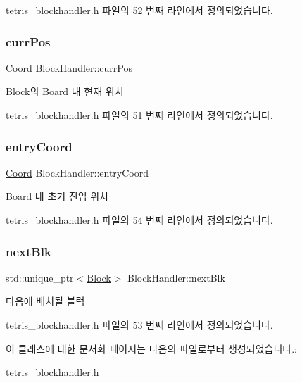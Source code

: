 tetris\+\_\+blockhandler.\+h 파일의 52 번째 라인에서 정의되었습니다.

\mbox{\label{class_block_handler_a11bd634fdc179446f9c6751e2394999e}} 
\subsubsection{\texorpdfstring{curr\+Pos}{currPos}}
{\footnotesize\ttfamily \mbox{\hyperlink{struct_coord}{Coord}} Block\+Handler\+::curr\+Pos}



Block의 \mbox{\hyperlink{class_board}{Board}} 내 현재 위치 



tetris\+\_\+blockhandler.\+h 파일의 51 번째 라인에서 정의되었습니다.

\mbox{\label{class_block_handler_a5a2b1799763c46ced8a197775ca13fa7}} 
\subsubsection{\texorpdfstring{entry\+Coord}{entryCoord}}
{\footnotesize\ttfamily \mbox{\hyperlink{struct_coord}{Coord}} Block\+Handler\+::entry\+Coord}



\mbox{\hyperlink{class_board}{Board}} 내 초기 진입 위치 



tetris\+\_\+blockhandler.\+h 파일의 54 번째 라인에서 정의되었습니다.

\mbox{\label{class_block_handler_a7a7f96fa7c0d44f9e0fb5e52ebc9c428}} 
\subsubsection{\texorpdfstring{next\+Blk}{nextBlk}}
{\footnotesize\ttfamily std\+::unique\+\_\+ptr$<$\mbox{\hyperlink{class_block}{Block}}$>$ Block\+Handler\+::next\+Blk}



다음에 배치될 블럭 



tetris\+\_\+blockhandler.\+h 파일의 53 번째 라인에서 정의되었습니다.



이 클래스에 대한 문서화 페이지는 다음의 파일로부터 생성되었습니다.\+:\begin{DoxyCompactItemize}
\item 
\mbox{\hyperlink{tetris__blockhandler_8h}{tetris\+\_\+blockhandler.\+h}}\end{DoxyCompactItemize}

